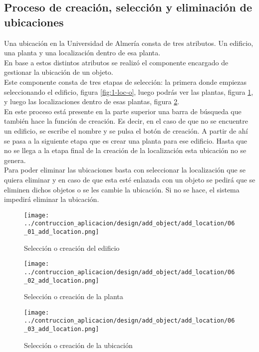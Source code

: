 \subsection{Proceso de creación, selección y eliminación de ubicaciones}
Una ubicación en la Universidad de Almería consta de tres atributos. Un edificio, una planta y una localización dentro de esa planta.
\\En base a estos distintos atributos se realizó el componente encargado de gestionar la ubicación de un objeto.
\\Este componente consta de tres etapas de selección: la primera donde empiezas seleccionando el edificio, figura \ref{fig:1-loc-o}, luego podrás ver las plantas, figura \ref{fig:2-loc-o}, y luego las localizaciones dentro de esas plantas, figura \ref{fig:3-loc-o}.
\\En este proceso está presente en la parte superior una barra de búsqueda que también hace la función de creación. Es decir, en el caso de que no se encuentre un edificio, se escribe el nombre y se pulsa el botón de creación. A partir de ahí se pasa a la siguiente etapa que es crear una planta para ese edificio. Hasta que no se llega a la etapa final de la creación de la localización esta ubicación no se genera.
\\Para poder eliminar las ubicaciones basta con seleccionar la localización que se quiera eliminar y en caso de que esta esté enlazada con un objeto se pedirá que se eliminen dichos objetos o se les cambie la ubicación. Si no se hace, el sistema impedirá eliminar la ubicación.
\begin{figure}[ht]
    \begin{minipage}{0.48\textwidth}
        \centering
        \texttt{[image: ../contruccion\_aplicacion/design/add\_object/add\_location/06\_01\_add\_location.png]}
        \caption{Selección o creación del edificio}\label{fig:1-loc-o}
    \end{minipage}\hfill
    \begin{minipage}{0.48\textwidth}
        \centering
        \texttt{[image: ../contruccion\_aplicacion/design/add\_object/add\_location/06\_02\_add\_location.png]}
        \caption{Selección o creación de la planta}\label{fig:2-loc-o}
    \end{minipage}
\end{figure}
\begin{figure}[ht]
    \centering
    \texttt{[image: ../contruccion\_aplicacion/design/add\_object/add\_location/06\_03\_add\_location.png]}
    \caption{Selección o creación de la ubicación}\label{fig:3-loc-o}
\end{figure}

